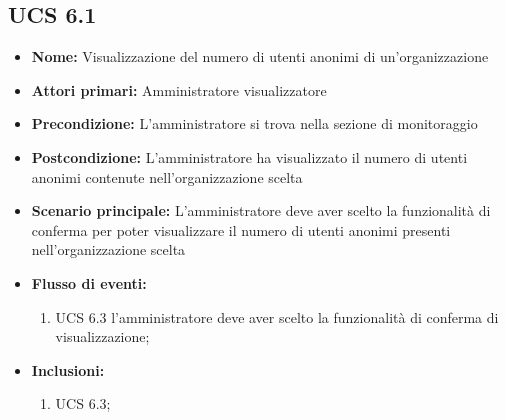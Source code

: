 \subsection{UCS 6.1}%
\begin{itemize}
\item \textbf{Nome:} Visualizzazione del numero di utenti anonimi di un'organizzazione
\item \textbf{Attori primari:} Amministratore visualizzatore
\item \textbf{Precondizione:} L'amministratore si trova nella sezione di monitoraggio
\item \textbf{Postcondizione:} L'amministratore ha visualizzato il numero di utenti anonimi contenute nell'organizzazione scelta
\item \textbf{Scenario principale:} L'amministratore deve aver scelto la funzionalità di conferma per poter visualizzare il numero di utenti anonimi presenti nell'organizzazione scelta
\item \textbf{Flusso di eventi:} 
\begin{enumerate}
	\item UCS 6.3 l'amministratore deve aver scelto la funzionalità di conferma di visualizzazione;
\end{enumerate}
\item \textbf{Inclusioni:}
\begin{enumerate}
	\item UCS 6.3;
\end{enumerate}
\end{itemize}

